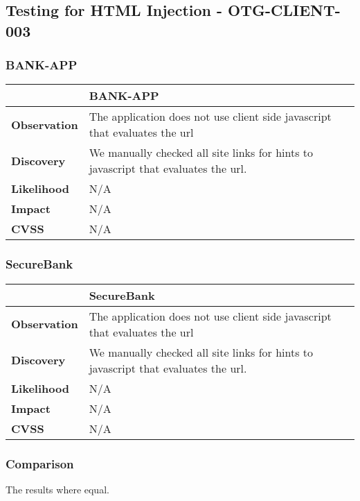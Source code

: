\subsection{Testing for HTML Injection - OTG-CLIENT-003}
\subsubsection{BANK-APP}
\begin{tabular*}{\textwidth}{ p{} | p{} }\hline
    & \textbf{BANK-APP} \\ \hline
    \textbf{Observation} & 
    	The application does not use client side javascript that evaluates the url
    \\
    \textbf{Discovery} & 
    	We manually checked all site links for hints to javascript that evaluates the url.
    \\
    \textbf{Likelihood} & 
    	N/A
    \\
    \textbf{Impact} & 
    	N/A
    \\
    \textbf{CVSS} & 
        N/A
    \\
   	\hline
\end{tabular*}

\subsubsection{SecureBank}
\begin{tabular*}{\textwidth}{ p{} | p{} }\hline
    & \textbf{SecureBank} \\ \hline
    \textbf{Observation} & 
    	The application does not use client side javascript that evaluates the url
    \\
    \textbf{Discovery} & 
    	We manually checked all site links for hints to javascript that evaluates the url.
    \\
    \textbf{Likelihood} & 
    	N/A
    \\
    \textbf{Impact} & 
    	N/A
    \\
    \textbf{CVSS} & 
        N/A
    \\
   	\hline
\end{tabular*}

\subsubsection{Comparison}
The results where equal.
\clearpage